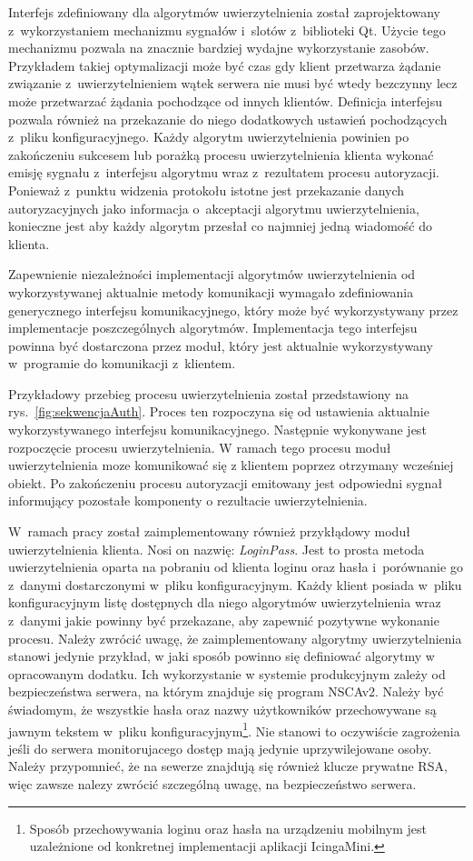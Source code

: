 Interfejs zdefiniowany dla algorytmów uwierzytelnienia został
zaprojektowany z~wykorzystaniem mechanizmu sygnałów i~slotów
z~biblioteki Qt. Użycie tego mechanizmu pozwala na znacznie bardziej
wydajne wykorzystanie zasobów. Przykładem takiej optymalizacji może
być czas gdy klient przetwarza żądanie związanie z~uwierzytelnieniem
wątek serwera nie musi być wtedy bezczynny lecz może przetwarzać
żądania pochodzące od innych klientów. Definicja interfejsu pozwala
również na przekazanie do niego dodatkowych ustawień pochodzących
z~pliku konfiguracyjnego. Każdy algorytm uwierzytelnienia powinien po
zakończeniu sukcesem lub porażką procesu uwierzytelnienia klienta
wykonać emisję sygnału z~interfejsu algorytmu wraz z~rezultatem
procesu autoryzacji. Ponieważ z~punktu widzenia protokołu istotne jest
przekazanie danych autoryzacyjnych jako informacja o~akceptacji
algorytmu uwierzytelnienia, konieczne jest aby każdy algorytm przesłał
co najmniej jedną wiadomość do klienta.

Zapewnienie niezależności implementacji algorytmów uwierzytelnienia od
wykorzystywanej aktualnie metody komunikacji wymagało zdefiniowania
generycznego interfejsu komunikacyjnego, który może być wykorzystywany
przez implementacje poszczególnych algorytmów. Implementacja tego
interfejsu powinna być dostarczona przez moduł, który jest aktualnie
wykorzystywany w~programie do komunikacji z~klientem.


Przykładowy przebieg procesu uwierzytelnienia został przedstawiony na
rys.~\ref{fig:sekwencjaAuth}. Proces ten rozpoczyna się od ustawienia
aktualnie wykorzystywanego interfejsu komunikacyjnego. Następnie
wykonywane jest rozpoczęcie procesu uwierzytelnienia. W ramach tego
procesu moduł uwierzytelnienia moze komunikować się z klientem poprzez
otrzymany wcześniej obiekt. Po zakończeniu procesu autoryzacji
emitowany jest odpowiedni sygnał informujący pozostałe komponenty o
rezultacie uwierzytelnienia.

W~ramach pracy został zaimplementowany również przykłądowy moduł
uwierzytelnienia klienta. Nosi on nazwię: {\em LoginPass}. Jest to
prosta metoda uwierzytelnienia oparta na pobraniu od klienta loginu
oraz hasła i~porównanie go z~danymi dostarczonymi w~pliku
konfiguracyjnym. Każdy klient posiada w~pliku konfiguracyjnym listę
dostępnych dla niego algorytmów uwierzytelnienia wraz z~danymi jakie
powinny być przekazane, aby zapewnić pozytywne wykonanie
procesu. Należy zwrócić uwagę, że zaimplementowany algorytmy
uwierzytelnienia stanowi jedynie przykład, w jaki sposób powinno się
definiować algorytmy w opracowanym dodatku. Ich wykorzystanie w
systemie produkcyjnym zależy od bezpieczeństwa serwera, na którym
znajduje się program NSCAv2. Należy być świadomym, że wszystkie hasła
oraz nazwy użytkowników przechowywane są jawnym tekstem w~pliku
konfiguracyjnym\footnote{Sposób przechowywania loginu oraz hasła na
  urządzeniu mobilnym jest uzależnione od konkretnej implementacji
  aplikacji IcingaMini.}. Nie stanowi to oczywiście zagrożenia jeśli
do serwera monitorujacego dostęp mają jedynie uprzywilejowane
osoby. Należy przypomnieć, że na sewerze znajdują się również klucze
prywatne RSA, więc zawsze nalezy zwrócić szczególną uwagę, na
bezpieczeństwo serwera.

